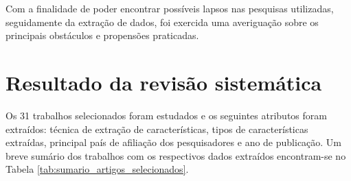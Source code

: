 \documentclass[
	12pt,				%
	oneside,			%
	a4paper,			%
	english,			%
	brazil				%
	]{abntex2ppgsi}
\begin{document}
Com a finalidade de poder encontrar possíveis lapsos nas pesquisas utilizadas, seguidamente da extração de dados, foi exercida uma averiguação sobre os principais obstáculos e propensões praticadas.

\section{Resultado da revisão sistemática}

Os 31 trabalhos selecionados foram estudados e os seguintes atributos foram extraídos: técnica de extração de características, tipos de características extraídas, principal país de afiliação dos pesquisadores e ano de publicação. Um breve sumário dos trabalhos com os respectivos dados extraídos encontram-se no Tabela \ref{tab:sumario_artigos_selecionados}.
\end{document}
